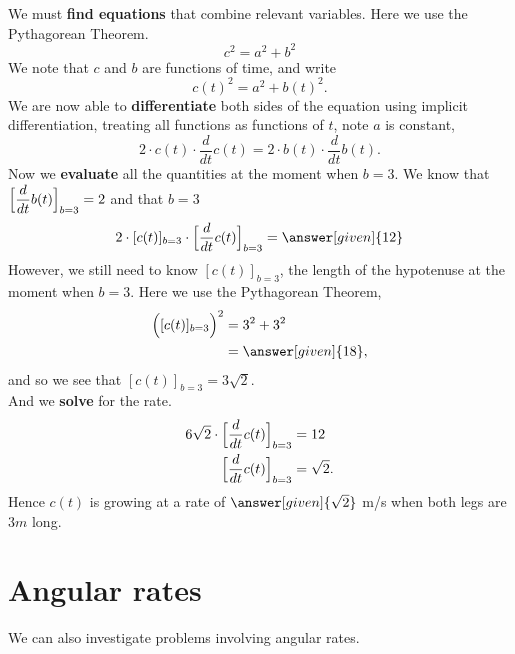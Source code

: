 \documentclass{ximera}
\begin{document}
\begin{example}
\begin{explanation}
    We must \textbf{find equations} that combine relevant
    variables. Here we use the Pythagorean Theorem.
    \[
    c^2 = a^2 + b^2
    \]
   We note that $c$ and $b$ are functions of time, and write
    \[
    c(t)^2 = a^2 + b(t)^2.
    \]
    We are now able to \textbf{differentiate} both sides of the equation using
    implicit differentiation, treating all functions as functions of
    $t$, note $a$ is constant,
    \[
    2\cdot c(t)\cdot \dfrac{d}{dt}c(t) = 2\cdot b(t)\cdot \dfrac{d}{dt}b(t).
    \]
    Now we \textbf{evaluate} all the quantities at the moment when $b=3$. We
    know that $\Bigl[\dfrac{d}{dt}b(t)\Bigr]_{b=3} = 2$ and that $b = 3$
    \[
    2\cdot [c(t)]_{b=3}\cdot \Bigl[\dfrac{d}{dt}c(t)\Bigr]_{b=3} = \answer[given]{12}
    \]
    However, we still need to know $[c(t)]_{b=3}$, the length of the hypotenuse at the moment when $b=3$. Here we use
    the Pythagorean Theorem,
    \begin{align*}
    \Bigl([c(t)]_{b=3}\Bigr)^2 &= 3^2 + 3^2\\
    &=\answer[given]{18},
    \end{align*}
    and so we see that $[c(t)]_{b=3} = 3\sqrt{2}$. \\
    And we \textbf{solve} for the rate.\\
    \begin{align*}
      6\sqrt{2}\cdot \Bigl[\dfrac{d}{dt}c(t)\Bigr]_{b=3} &= 12 \\     
      \Bigl[\dfrac{d}{dt}c(t)\Bigr]_{b=3} &= \sqrt{2}.
    \end{align*}
    Hence $c(t)$ is growing at a rate of $\answer[given]{\sqrt{2}}$ m/s when both legs are $3m$ long.
  \end{explanation}
\end{example}


\section{Angular rates}


We can also investigate problems involving angular rates.
\end{document}
